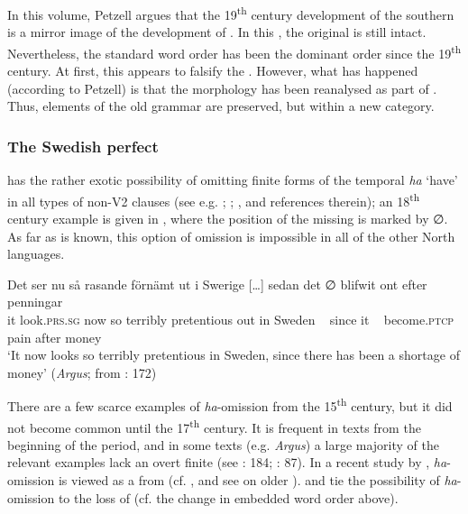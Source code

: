 \documentclass[output=paper]{langscibook}
\begin{document}
In this volume, Petzell argues that the 19\textsuperscript{th} century development of the southern   is a mirror image of the development of . In this , the original  is still intact. Nevertheless, the standard word order has been the dominant order since the 19\textsuperscript{th} century. At first, this appears to falsify the . However, what has happened (according to Petzell) is that the  morphology has been reanalysed as part of . Thus, elements of the old grammar are preserved, but within a new category.


\subsubsection{ The Swedish perfect}\label{sec:intro:3.1.2}


 has the rather exotic possibility of omitting finite forms of the temporal  \textit{ha} ‘have’ in all types of non-V2 clauses (see e.g. \citealt{Julien2002}; \citealt{AndreassonEtAl2004}; \citealt{Backstrom2019}, and references therein); an 18\textsuperscript{th} century example is given in , where the position of the missing  is marked by ∅. As far as is known, this option of  omission is impossible in all of the other North  languages.


\ea\label{ex:intro:6}
\gll  Det     ser         nu   så rasande   förnämt   ut     i   Swerige […] sedan   det ∅ blifwit     ont     efter penningar\\
it     look.\textsc{prs.sg}   now   so terribly   pretentious out in   Sweden ~ since   it  ~ become\textsc{.ptcp}  pain    after money\\
\glt ‘It now looks so terribly pretentious in Sweden, since there has been a shortage of money’ (\textit{Argus}; from \citealt{Johannisson1945}: 172)
\z


There are a few scarce examples of \textit{ha}{}-omission from the 15\textsuperscript{th} century, but it did not become common until the 17\textsuperscript{th} century. It is frequent in texts from the beginning of the  period, and in some texts (e.g. \textit{Argus}) a large majority of the relevant examples lack an overt finite  (see \citealt{Johannisson1945}: 184; \citealt{Backstrom2019}: 87). In a recent study by \citet{Backstrom2019}, \textit{ha}{}-omission is viewed as a  from  (cf. \citealt{Johannisson1945}, and see \citealt{Breitbarth2005} on older ). \citet{Larsson2009} and \citet{Sangfelt2019} tie the possibility of \textit{ha}{}-omission to the loss of   (cf. the change in embedded word order above).
\end{document}
